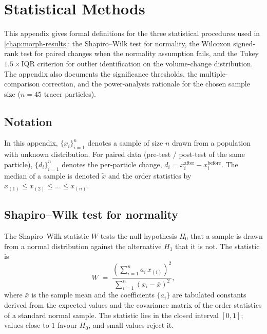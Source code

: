 \chapter{Statistical Methods}
\label{chap:appC}


\begin{chapterpreview}
This appendix gives formal definitions for the three statistical
procedures used in \cref{chap:morph-results}: the Shapiro--Wilk test
for normality, the Wilcoxon signed-rank test for paired changes
when the normality assumption fails, and the Tukey
$1.5\times$\gls{IQR} criterion for outlier identification on the
volume-change distribution. The appendix also documents the
significance thresholds, the multiple-comparison correction, and the
power-analysis rationale for the chosen sample size ($n=45$ tracer
particles).
\end{chapterpreview}

\section{Notation}

In this appendix, $\{x_i\}_{i=1}^{n}$ denotes a sample of size $n$ drawn
from a population with unknown distribution. For paired data
(pre-test / post-test of the same particle), $\{d_i\}_{i=1}^{n}$
denotes the per-particle change, $d_i = x_i^{\mathrm{after}} -
x_i^{\mathrm{before}}$. The median of a sample is denoted
$\widetilde{x}$ and the order statistics by
$x_{(1)} \le x_{(2)} \le \dots \le x_{(n)}$.

\section{Shapiro--Wilk test for normality}
\label{sec:appC-shapiro}

The Shapiro--Wilk statistic $W$ tests the null hypothesis $H_0$ that a
sample is drawn from a normal distribution against the alternative
$H_1$ that it is not. The statistic is
\begin{equation}
W \;=\; \frac{\left(\sum_{i=1}^{n} a_i\, x_{(i)}\right)^{2}}
              {\sum_{i=1}^{n}\left(x_i - \bar{x}\right)^{2}},
\label{eq:appC-shapiro}
\end{equation}
where $\bar{x}$ is the sample mean and the coefficients $\{a_i\}$ are
tabulated constants derived from the expected values and the
covariance matrix of the order statistics of a standard normal sample.
The statistic lies in the closed interval $[0,1]$; values close to $1$
favour $H_0$, and small values reject it.

